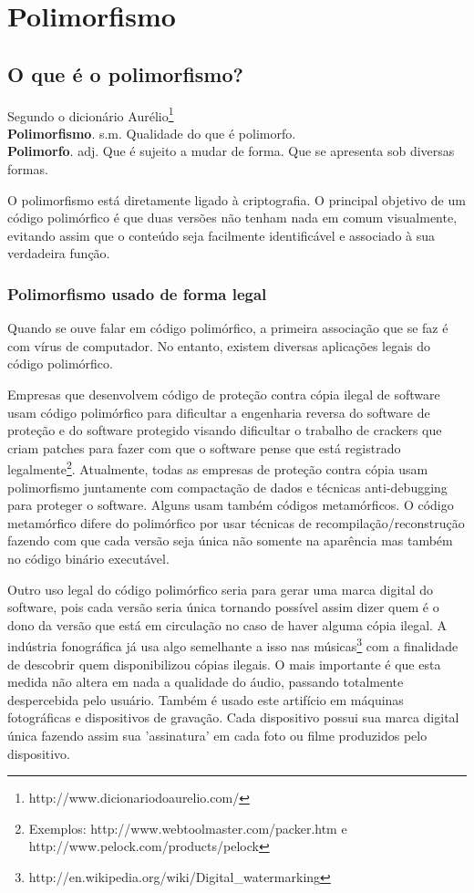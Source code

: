 \chapter{Polimorfismo}

\section{O que é o polimorfismo?}

	Segundo o dicionário Aurélio\footnote{http://www.dicionariodoaurelio.com/}\\
\textbf{Polimorfismo}. s.m. Qualidade do que é polimorfo.\\
\textbf{Polimorfo}. adj. Que é sujeito a mudar de forma. Que se apresenta sob diversas formas.


O polimorfismo está diretamente ligado à criptografia. O principal objetivo de um código polimórfico é que duas versões não tenham nada em comum visualmente, evitando assim que o conteúdo seja facilmente identificável e associado à sua verdadeira função. 

\subsection{Polimorfismo usado de forma legal}
Quando se ouve falar em código polimórfico, a primeira associação que se faz é com vírus de computador. No entanto, existem diversas aplicações legais do código polimórfico.

Empresas que desenvolvem código de proteção contra cópia ilegal de software usam código polimórfico para dificultar a engenharia reversa do software de proteção e do software protegido visando dificultar o trabalho de crackers que criam patches para fazer com que o software pense que está registrado legalmente\footnote{Exemplos: http://www.webtoolmaster.com/packer.htm e http://www.pelock.com/products/pelock}. Atualmente, todas as empresas de proteção contra cópia usam polimorfismo juntamente com compactação de dados e técnicas anti-debugging para proteger o software. Alguns usam também códigos metamórficos. O código metamórfico difere do polimórfico por usar técnicas de recompilação/reconstrução fazendo com que cada versão seja única não somente na aparência mas também no código binário executável.

Outro uso legal do código polimórfico seria para gerar uma marca digital do software, pois cada versão seria única tornando possível assim dizer quem é o dono da versão que está em circulação no caso de haver alguma cópia ilegal. A indústria fonográfica já usa algo semelhante a isso nas músicas\footnote{http://en.wikipedia.org/wiki/Digital\_watermarking} com a finalidade de descobrir quem disponibilizou cópias ilegais. O mais importante é que esta medida não altera em nada a qualidade do áudio, passando totalmente despercebida pelo usuário. Também é usado este artifício em máquinas fotográficas e dispositivos de gravação. Cada dispositivo possui sua marca digital única fazendo assim sua 'assinatura' em cada foto ou filme produzidos pelo dispositivo.

